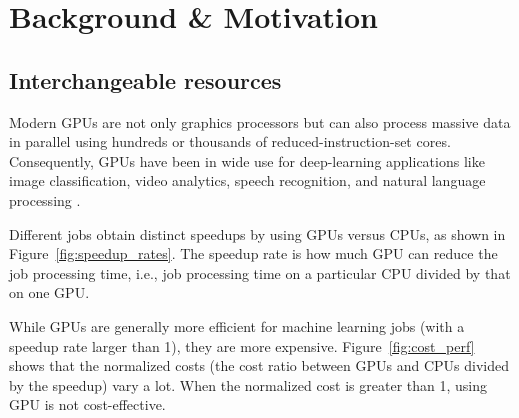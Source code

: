\section{Background \& Motivation}
\label{sec:background}

\subsection{Interchangeable resources}
\label{sec:speedup}


Modern GPUs are not only graphics processors but can also process massive data in parallel using hundreds or thousands of reduced-instruction-set cores.
Consequently, GPUs have been in wide use for deep-learning applications like image classification, video analytics, speech recognition, and natural language processing \cite{image_classfication_deep,image_classification_cnn,cuda_video_coding, nn_nlp, deep_cnn_nlp}.



Different jobs obtain distinct speedups by using GPUs versus CPUs, as shown in Figure~\eqref{fig:speedup_rates}. The speedup rate is how much GPU can reduce the job processing time, i.e., job processing time on a particular CPU divided by that on one GPU. 

While GPUs are generally more efficient for machine learning jobs (with a speedup rate larger than 1), they are more expensive. Figure~\eqref{fig:cost_perf} shows that the normalized costs (the cost ratio between GPUs and CPUs divided by the speedup) vary a lot. When the normalized cost is greater than 1, using GPU is not cost-effective. 


